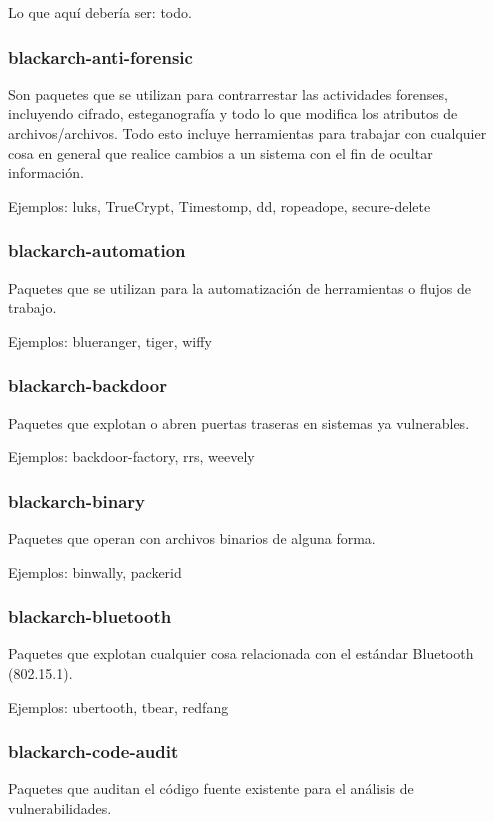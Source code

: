 \documentclass[a4paper, oneside, 11pt]{book}
\begin{document}
Lo que aqu\'i deber\'ia ser: todo.

\subsubsection{blackarch-anti-forensic}
Son paquetes que se utilizan para contrarrestar las actividades forenses,
incluyendo cifrado, esteganograf\'ia y todo lo que modifica los atributos de archivos/archivos.
Todo esto incluye herramientas para trabajar con cualquier cosa en general que realice cambios a un sistema con
el fin de ocultar informaci\'on.

Ejemplos: luks, TrueCrypt, Timestomp, dd, ropeadope, secure-delete

\subsubsection{blackarch-automation}
Paquetes que se utilizan para la automatizaci\'on de herramientas o flujos de trabajo.

Ejemplos: blueranger, tiger, wiffy

\subsubsection{blackarch-backdoor}
Paquetes que explotan o abren puertas traseras en sistemas ya vulnerables.

Ejemplos: backdoor-factory, rrs, weevely

\subsubsection{blackarch-binary}
Paquetes que operan con archivos binarios de alguna forma.

Ejemplos: binwally, packerid

\subsubsection{blackarch-bluetooth}
Paquetes que explotan cualquier cosa relacionada con el est\'andar Bluetooth (802.15.1).

Ejemplos: ubertooth, tbear, redfang

\subsubsection{blackarch-code-audit}
Paquetes que auditan el c\'odigo fuente existente para el an\'alisis de vulnerabilidades.
\end{document}
